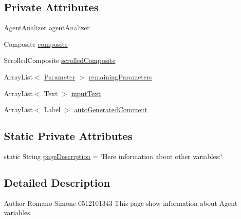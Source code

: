 \subsection*{Private Attributes}
\begin{DoxyCompactItemize}
\item 
\hyperlink{classit_1_1isislab_1_1masonassisteddocumentation_1_1mason_1_1analizer_1_1_agent_analizer}{Agent\-Analizer} \hyperlink{classit_1_1isislab_1_1masonassisteddocumentation_1_1mason_1_1wizards_1_1_f___agent_variables_page_a7201c89fcb48630684629ccea3c39de4}{agent\-Analizer}
\item 
Composite \hyperlink{classit_1_1isislab_1_1masonassisteddocumentation_1_1mason_1_1wizards_1_1_f___agent_variables_page_ae1c0cb2824f39253ba724603c4ba6920}{composite}
\item 
Scrolled\-Composite \hyperlink{classit_1_1isislab_1_1masonassisteddocumentation_1_1mason_1_1wizards_1_1_f___agent_variables_page_af1e4ae0be128f9bae8b445938b59fd9c}{scrolled\-Composite}
\item 
Array\-List$<$ \hyperlink{classit_1_1isislab_1_1masonassisteddocumentation_1_1mason_1_1analizer_1_1_parameter}{Parameter} $>$ \hyperlink{classit_1_1isislab_1_1masonassisteddocumentation_1_1mason_1_1wizards_1_1_f___agent_variables_page_a84c4e7c9e38a660e5befa94f5cac893f}{remaining\-Parameters}
\item 
Array\-List$<$ Text $>$ \hyperlink{classit_1_1isislab_1_1masonassisteddocumentation_1_1mason_1_1wizards_1_1_f___agent_variables_page_a4bec9c841bd5ecadb3a8780469cb0f3a}{input\-Text}
\item 
Array\-List$<$ Label $>$ \hyperlink{classit_1_1isislab_1_1masonassisteddocumentation_1_1mason_1_1wizards_1_1_f___agent_variables_page_a5256a71ed3e45356ac900afc1b75c1f2}{auto\-Generated\-Comment}
\end{DoxyCompactItemize}
\subsection*{Static Private Attributes}
\begin{DoxyCompactItemize}
\item 
static String \hyperlink{classit_1_1isislab_1_1masonassisteddocumentation_1_1mason_1_1wizards_1_1_f___agent_variables_page_ad00b7f1c3594ad989af7fb14b39fa7d1}{page\-Description} = \char`\"{}Here information about other variables\-:\char`\"{}
\end{DoxyCompactItemize}


\subsection{Detailed Description}
\begin{DoxyAuthor}{Author}
Romano Simone 0512101343 This page show information about Agent variables. 
\end{DoxyAuthor}


